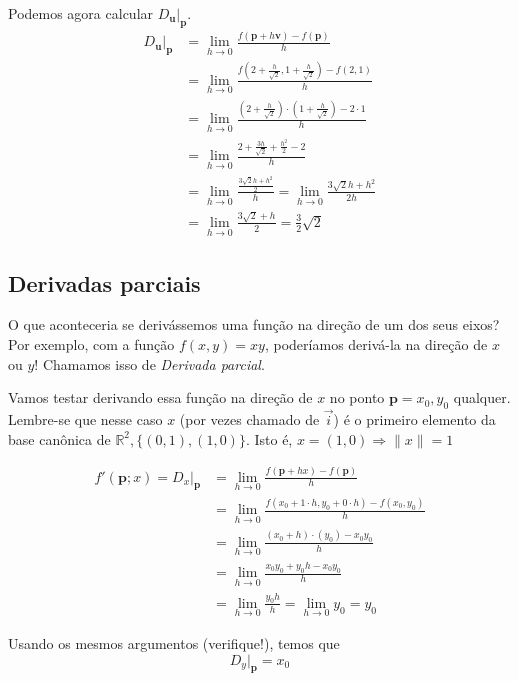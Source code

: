 \documentclass[
  portuguese,
  letterpaper,
  DIV=11,
  numbers=noendperiod]{scrreport}
\begin{document}
Podemos agora calcular \(D_{\pmb{u}}\rvert_{\pmb{p}}\). \[
\begin{aligned}
D_{\pmb{u}}\rvert_{\pmb{p}} &= \lim_{h \rightarrow 0}
\frac{f(\pmb{p} + h\pmb{v})-f(\pmb{p})}{h} \\
&= \lim_{h\rightarrow 0} \frac{f\left(2+\frac{h}{\sqrt{2}},1+\frac{h}{\sqrt{2}}\right)-f(2,1)}{h} \\
& = \lim_{h\rightarrow 0} \frac{\left(2+\frac{h}{\sqrt{2}}\right)\cdot\left(1+\frac{h}{\sqrt{2}}\right) - 2\cdot 1}{h} \\
&= \lim_{h\rightarrow 0} \frac{2 + \frac{3h}{\sqrt{2}} + \frac{h^2}{2} - 2}{h} \\
& = \lim_{h\rightarrow 0} \frac{\frac{3\sqrt{2}h + h^2}{2}}{h} =
\lim_{h\rightarrow 0} \frac{3\sqrt{2}h+h^2}{2h}\\
&= \lim_{h\rightarrow 0} \frac{3\sqrt{2} + h}{2} = \frac{3}{2}\sqrt{2}
\end{aligned}
\]

\subsection{Derivadas parciais}\label{derivadas-parciais}

O que aconteceria se derivássemos uma função na direção de um dos seus
eixos? Por exemplo, com a função \(f(x,y) = xy\), poderíamos derivá-la
na direção de \(x\) ou \(y\)! Chamamos isso de \emph{Derivada parcial}.

Vamos testar derivando essa função na direção de \(x\) no ponto
\(\pmb{p} = x_0, y_0\) qualquer. Lembre-se que nesse caso \(x\) (por
vezes chamado de \(\vec{i}\)) é o primeiro elemento da base canônica de
\(\mathbb{R}^2, \{(0,1),(1,0)\}\). Isto é,
\(x = (1,0) \Rightarrow \lVert x \rVert = 1\)

\[
\begin{aligned}
  f'(\pmb{p}; x) = D_{x}\rvert_{\pmb{p}} 
  &= \lim_{h \rightarrow 0} \frac{f(\pmb{p} + hx) - f(\pmb{p})}{h} \\
  &= \lim_{h\rightarrow 0} \frac{f(x_0 + 1 \cdot h, y_0 + 0 \cdot h) - f(x_0,y_0)}{h} \\
  &= \lim_{h\rightarrow 0} \frac{(x_0+h)\cdot(y_0) - x_{0}y_0}{h} \\
  &= \lim_{h\rightarrow 0} \frac{x_0y_0 + y_0h - x_0y_0}{h} \\
  &= \lim_{h\rightarrow 0} \frac{y_0h}{h} = \lim_{h\rightarrow 0} y_0  = y_0
\end{aligned}
\]

Usando os mesmos argumentos (verifique!), temos que \[
D_{y}\rvert_{\pmb{p}} = x_0
\]
\end{document}
